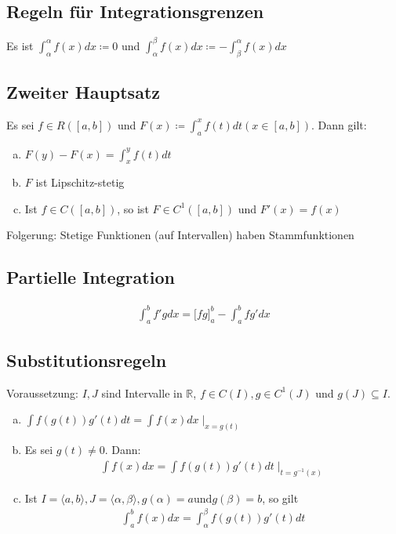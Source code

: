 \documentclass{article}
\begin{document}
\subsection{Regeln für Integrationsgrenzen}
Es ist $\int_\alpha^\alpha f(x) dx \coloneqq 0$ und $\int_\alpha^\beta f(x) dx \coloneqq -\int_\beta^\alpha f(x) dx$

\subsection{Zweiter Hauptsatz}
Es sei $f \in R([a,b])$ und $F(x) \coloneqq \int_a^x f(t) dt (x \in [a,b])$. Dann gilt:
\begin{enumerate}[a)]
    \item $F(y) - F(x) = \int_x^y f(t) dt$
    \item $F$ ist Lipschitz-stetig
    \item Ist $f \in C([a,b])$, so ist $F \in C^1([a,b])$ und $F'(x) = f(x)$
\end{enumerate}
Folgerung: Stetige Funktionen (auf Intervallen) haben Stammfunktionen

\subsection{Partielle Integration}
\begin{align*}
    \int_a^b f'g dx = \Big[fg \Big]_{a}^b - \int_a^b fg' dx
\end{align*}

\subsection{Substitutionsregeln}
Voraussetzung: $I,J$ sind Intervalle in $\mathbb{R}$, $f \in C(I), g \in C^1(J)$ und $g(J) \subseteq I$.
\begin{enumerate}[a)]
    \item $\int f(g(t)) g'(t) dt = \int f(x) dx \mid_{x=g(t)}$
    \item Es sei $g(t) \neq 0$. Dann:
    \begin{align*}
        \int f(x) dx = \int f(g(t)) g'(t) dt \mid_{t=g^{-1}(x)}
    \end{align*}
    \item Ist $I = \langle a,b \rangle, J = \langle \alpha, \beta \rangle, g(\alpha) = a \text{und} g(\beta)=b$, so gilt
    \begin{align*}
        \int_a^b f(x) dx = \int_\alpha^\beta f(g(t))g'(t)dt
    \end{align*}
\end{enumerate}
\end{document}
